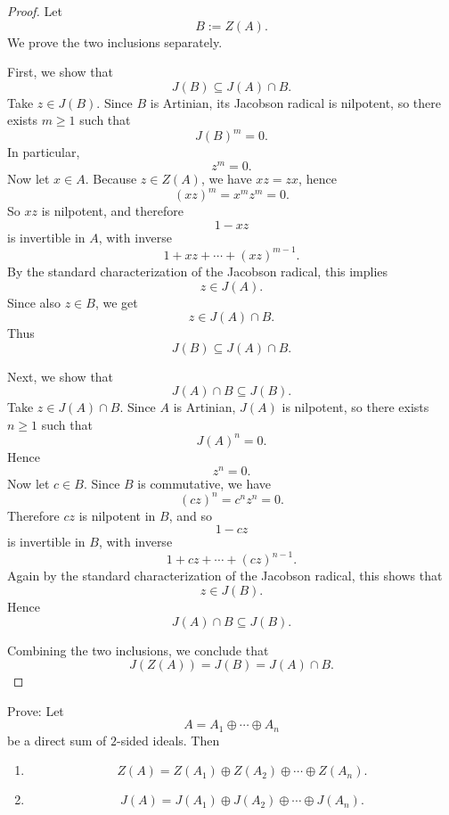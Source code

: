 \begin{proof}
    Let
    \[
        B:=Z(A).
    \]
    We prove the two inclusions separately.

    First, we show that
    \[
        J(B)\subseteq J(A)\cap B.
    \]
    Take \(z\in J(B)\). Since \(B\) is Artinian, its Jacobson radical is nilpotent, so there exists
    \(m\ge 1\) such that
    \[
        J(B)^m=0.
    \]
    In particular,
    \[
        z^m=0.
    \]
    Now let \(x\in A\). Because \(z\in Z(A)\), we have \(xz=zx\), hence
    \[
        (xz)^m=x^m z^m=0.
    \]
    So \(xz\) is nilpotent, and therefore
    \[
        1-xz
    \]
    is invertible in \(A\), with inverse
    \[
        1+xz+\cdots +(xz)^{m-1}.
    \]
    By the standard characterization of the Jacobson radical, this implies
    \[
        z\in J(A).
    \]
    Since also \(z\in B\), we get
    \[
        z\in J(A)\cap B.
    \]
    Thus
    \[
        J(B)\subseteq J(A)\cap B.
    \]

    Next, we show that
    \[
        J(A)\cap B\subseteq J(B).
    \]
    Take \(z\in J(A)\cap B\). Since \(A\) is Artinian, \(J(A)\) is nilpotent, so there exists
    \(n\ge 1\) such that
    \[
        J(A)^n=0.
    \]
    Hence
    \[
        z^n=0.
    \]
    Now let \(c\in B\). Since \(B\) is commutative, we have
    \[
        (cz)^n=c^n z^n=0.
    \]
    Therefore \(cz\) is nilpotent in \(B\), and so
    \[
        1-cz
    \]
    is invertible in \(B\), with inverse
    \[
        1+cz+\cdots +(cz)^{n-1}.
    \]
    Again by the standard characterization of the Jacobson radical, this shows that
    \[
        z\in J(B).
    \]
    Hence
    \[
        J(A)\cap B\subseteq J(B).
    \]

    Combining the two inclusions, we conclude that
    \[
        J(Z(A))=J(B)=J(A)\cap B.
    \]
\end{proof}

\begin{exercise}
    Prove: Let
    \[
        A = A_1 \oplus \cdots \oplus A_n
    \]
    be a direct sum of \(2\)-sided ideals. Then
    \begin{enumerate}
        \renewcommand{\labelenumi}{(\roman{enumi})}
        \item
              \[
                  Z(A) = Z(A_1) \oplus Z(A_2) \oplus \cdots \oplus Z(A_n).
              \]
        \item
              \[
                  J(A) = J(A_1) \oplus J(A_2) \oplus \cdots \oplus J(A_n).
              \]
    \end{enumerate}
\end{exercise}

